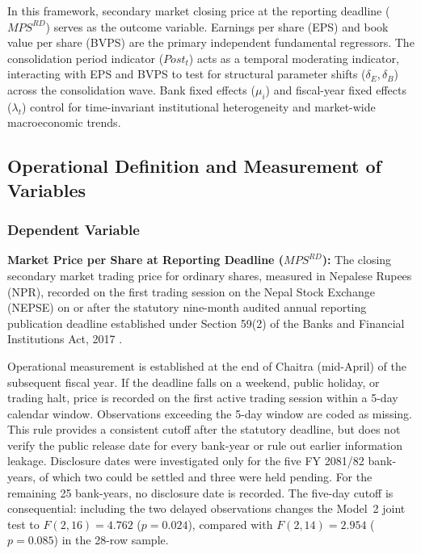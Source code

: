 

In this framework, secondary market closing price at the reporting deadline ($\mathit{MPS}^{RD}$) serves as the outcome variable. Earnings per share (EPS) and book value per share (BVPS) are the primary independent fundamental regressors. The consolidation period indicator ($\mathit{Post}_t$) acts as a temporal moderating indicator, interacting with EPS and BVPS to test for structural parameter shifts ($\delta_E, \delta_B$) across the consolidation wave. Bank fixed effects ($\mu_i$) and fiscal-year fixed effects ($\lambda_t$) control for time-invariant institutional heterogeneity and market-wide macroeconomic trends.

\subsection{Operational Definition and Measurement of Variables}

\subsubsection{Dependent Variable}
\textbf{Market Price per Share at Reporting Deadline ($\mathit{MPS}^{RD}$):}
The closing secondary market trading price for ordinary shares, measured in Nepalese Rupees (NPR), recorded on the first trading session on the Nepal Stock Exchange (NEPSE) on or after the statutory nine-month audited annual reporting publication deadline established under Section 59(2) of the Banks and Financial Institutions Act, 2017 \citep{bafia2017}.

Operational measurement is established at the end of Chaitra (mid-April) of the subsequent fiscal year. If the deadline falls on a weekend, public holiday, or trading halt, price is recorded on the first active trading session within a 5-day calendar window. Observations exceeding the 5-day window are coded as missing. This rule provides a consistent cutoff after the statutory deadline, but does not verify the public release date for every bank-year or rule out earlier information leakage. Disclosure dates were investigated only for the five FY 2081/82 bank-years, of which two could be settled and three were held pending. For the remaining 25 bank-years, no disclosure date is recorded. The five-day cutoff is consequential: including the two delayed observations changes the Model~2 joint test to $F(2,16)=4.762$ ($p=0.024$), compared with $F(2,14)=2.954$ ($p=0.085$) in the 28-row sample.

